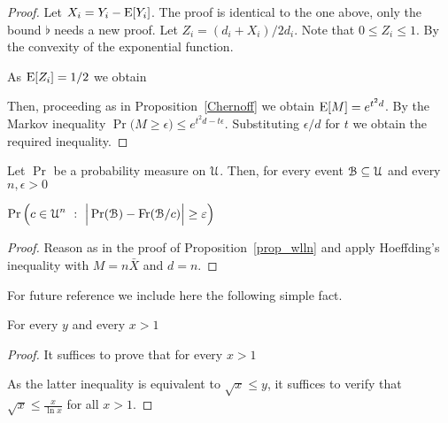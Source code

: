 \documentclass[sputnik.tex]{subfiles}
\begin{document}
\begin{proof}
Let $X_i=Y_i-{\rm E}[Y_i]$. The proof is identical to the one above, only the bound $\flat$ needs a new proof. Let $Z_i=(d_i+X_i)/2d_i$. Note that $0\le Z_i\le1$. By the convexity of the exponential function.



As ${\rm E}[Z_i]=1/2$ we obtain



Then, proceeding as in Proposition~\ref{Chernoff} we obtain ${\rm E}[M]=e^{t^2d}$. By the Markov inequality $\Pr \big(M\ge\epsilon\big)\le e^{t^2d-t\epsilon}$. Substituting $\epsilon/d$ for $t$ we obtain the required inequality.
\end{proof}

\begin{corollary} 
\def\ceq#1#2#3{\parbox[t]{45ex}{$\displaystyle #1$}\medrel{#2}{$\displaystyle #3$}}
Let $\Pr$ be a probability measure on $\EuScript U$.
Then, for every event $\EuScript B\subseteq\EuScript U$ and every $n,\epsilon>0$

\ceq{\hfill\Pr \Big(c\in\U^n\ :\ \Big|\Pr(\B) - \Fr(\B/c) \Big|\ge\epsilon\Big)}{\le}{2\exp\Big(-\frac{n\epsilon^{\scriptscriptstyle 2}}{2}\Big)}
\end{corollary}

\begin{proof}
Reason as in the proof of Proposition~\ref{prop_wlln} and apply Hoeffding's inequality with $M=n\bar X$ and $d=n$. 
\end{proof}



For future reference we include here the following simple fact.

\begin{proposition}\label{prop_disequazione}
For every $y$ and every $x>1$

\end{proposition}
\begin{proof}
It suffices to prove that for  every $x>1$


As the latter inequality is equivalent to $\sqrt{x}\le y$, it suffices to verify that $\sqrt{x}\le\displaystyle\frac{x}{\ln x}$ for all $x>1$.
\end{proof}
\end{document}
